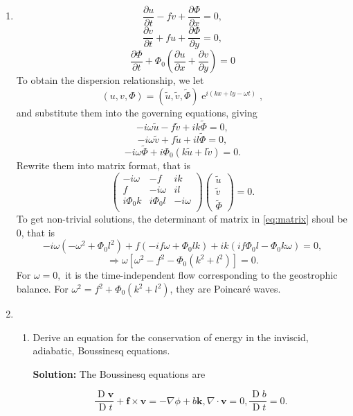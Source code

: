 \documentclass[a4paper]{article}
\begin{document}
\begin{enumerate}[label=\textbf{\arabic*.}]
	\item 
	$$\frac{\partial u}{\partial t}-fv+\frac{\partial \Phi}{\partial x}=0,$$
	$$\frac{\partial v}{\partial t}+fu+\frac{\partial \Phi}{\partial y}=0,$$
	$$\frac{\partial\Phi}{\partial t} + \Phi_0 \left(\frac{\partial u}{\partial x}+\frac{\partial v}{\partial y}\right)=0$$
	To obtain the dispersion relationship, we let
	$$(u,v,\Phi)=(\tilde{u},\tilde{v},\tilde{\Phi})\operatorname{e}^{i(kx+ly-\omega t)},$$
	and substitute them into the governing equations, giving
	$$-i\omega \tilde{u}-f\tilde{v}+ik\tilde{\Phi} = 0,$$
	$$-i\omega \tilde{v}+f\tilde{u}+il\tilde{\Phi} = 0,$$
	$$-i\omega \tilde{\Phi}+i\Phi_0(k\tilde{u}+l\tilde{v})= 0.$$
	Rewrite them into matrix format, that is
	\begin{equation}\label{eq:matrix}
		\left(
		\begin{matrix}
		-i\omega& -f& ik\\
		f & -i\omega & il\\
		i\Phi_0k & i\Phi_0 l & -i\omega \\
		\end{matrix}
		\right)\left(
		\begin{matrix}
		\tilde{u}\\
		\tilde{v}\\
		\tilde{\Phi}
		\end{matrix}
		\right)=0.
	\end{equation}
	To get non-trivial solutions, the determinant of matrix in \eqref{eq:matrix} shoul be 0, that is
	$$	-i\omega(-\omega^2+\Phi_0l^2)+f(-if\omega+\Phi_0lk)+ik(if\Phi_0l-\Phi_0k\omega)=0,$$
	$$\Longrightarrow\omega [\omega^2-f^2-\Phi_0(k^2+l^2)]=0.$$
	For $\omega =0,$ it is the time-independent flow corresponding to the geostrophic balance. For $\omega^2=f^2+\Phi_0(k^2+l^2)$, they are Poincar\'{e} waves.\\
	\item \begin{enumerate}[label=(\alph*)]%
		\setcounter{enumii}{0}
		\item Derive an equation for the conservation of energy in the inviscid, adiabatic, Boussinesq equations.
		
		\textbf{Solution:} The Boussinesq equations are
		
		\begin{subequations}
			\begin{equation}\label{eq:mom}
				\frac{\operatorname{D}\bm{v}}{\operatorname{D}t}+\bm{f}\times \bm{v}=-\nabla \phi +b \bm{k},
			\end{equation}
			\begin{equation}\label{eq:mass}
				\nabla \cdot \bm v=0,
			\end{equation}
			\begin{equation}\label{eq:temp}
				\frac{\operatorname{D}b}{\operatorname{D}t} =0.
			\end{equation}
		\end{subequations}
	

\end{enumerate}
\end{enumerate}
\end{document}
